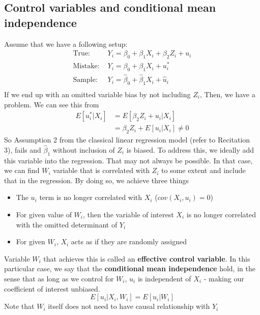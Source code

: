 \documentclass[12pt]{article}
\theoremstyle{definition}
\theoremstyle{property}
\theoremstyle{assumption}
\theoremstyle{example}
\theoremstyle{comment}
\begin{document}
\subsection{Control variables and conditional mean independence}
Assume that we have a following setup:
\[
\begin{aligned}
\text{True: }& Y_i = \beta_0 + \beta_1 X_i + \beta_2 Z_i+u_i\\
\text{Mistake: }& Y_i = \beta_0 + \beta_1 X_i + u_i^*\\
\text{Sample: }& Y_i = \hat{\beta}_0 + \hat{\beta}_1 X_i+ \hat{u}_i\\
\end{aligned}
\]
If we end up with an omitted variable bias by not including $Z_i$, Then, we have a problem. We can see this from
\[
\begin{aligned}
E[u_i^*|X_i]&=E[\beta_2Z_i+u_i|X_i]\\
&=\beta_2Z_i+E[u_i|X_i] \neq 0
\end{aligned}
\]
So Assumption 2 from the classical linear regression model (refer to Recitation 3), fails and $\hat{\beta}_1$ without inclusion of $Z_i$ is biased. To address this, we ideally add this variable into the regression. That may not always be possible. In that case, we can find $W_i$ variable that is correlated with $Z_i$ to some extent and include that in the regression. By doing so, we achieve three things
\begin{itemize}
\item The $u_i$ term is no longer correlated with $X_i$ ($cov(X_i, u_i)=0$)
\item For given value of $W_i$, then the variable of interest $X_i$ is no longer correlated with the omitted determinant of $Y_i$
\item For given $W_i$, $X_i$ acts as if they are randomly assigned
\end{itemize}
Variable $W_i$ that achieves this is called an \textbf{effective control variable}. In this particular case, we say that the \textbf{conditional mean independence} hold, in the sense that as long as we control for $W_i$, $u_i$ is independent of $X_i$ - making our coefficient of interest unbiased. 
\[
E[u_i|X_i,W_i]= E[u_i|W_i]
\]
Note that $W_i$ itself does not need to have causal relationship with $Y_i$
\end{document}
